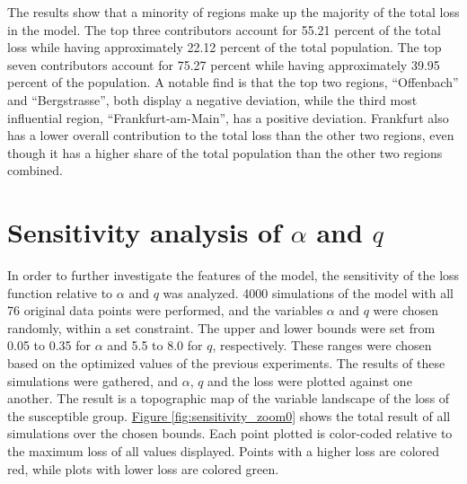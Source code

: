 The results show that a minority of regions make up the majority of the total loss in the model. The top three contributors
account for 55.21 percent of the total loss while having approximately 22.12 percent of the total population. The top seven
contributors account for 75.27 percent while having approximately 39.95 percent of the population. A notable find is that the
top two regions, ``Offenbach'' and ``Bergstrasse'', both display a negative deviation, while the third most influential region,
``Frankfurt-am-Main'', has a positive deviation. Frankfurt also has a lower overall contribution to the total loss than the other
two regions, even though it has a higher share of the total population than the other two regions combined.


\section{Sensitivity analysis of $\alpha$ and $q$}
In order to further investigate the features of the model, the sensitivity of the loss function relative to $\alpha$ and $q$ was
analyzed. 4000 simulations of the model with all 76 original data points were performed, and the variables
$\alpha$ and $q$ were chosen randomly, within a set constraint. The upper and lower bounds were set from 0.05 to 0.35 for 
$\alpha$ and 5.5 to 8.0 for $q$, respectively. These ranges were chosen based on the optimized values of the previous
experiments. The results of these simulations were gathered, and $\alpha$, $q$ and the loss were  plotted against one another.
The result is a topographic map of the variable landscape of the loss of the susceptible group.
\hyperref[fig:sensitivity_zoom0]{Figure \ref*{fig:sensitivity_zoom0}} shows the total result of all simulations over the chosen bounds.
Each point plotted is color-coded relative to the maximum loss of all values displayed. Points with a higher loss are colored red,
while plots with lower loss are colored green.\newline

